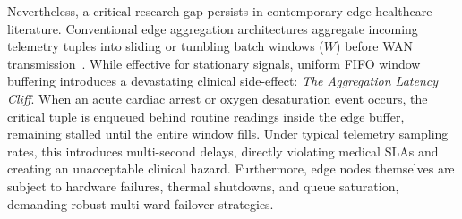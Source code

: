 \documentclass[conference]{IEEEtran}
\begin{document}
Nevertheless, a critical research gap persists in contemporary edge healthcare literature. Conventional edge aggregation architectures aggregate incoming telemetry tuples into sliding or tumbling batch windows ($W$) before WAN transmission~\cite{Pace2019}. While effective for stationary signals, uniform FIFO window buffering introduces a devastating clinical side-effect: \textit{The Aggregation Latency Cliff}. When an acute cardiac arrest or oxygen desaturation event occurs, the critical tuple is enqueued behind routine readings inside the edge buffer, remaining stalled until the entire window fills. Under typical telemetry sampling rates, this introduces multi-second delays, directly violating medical SLAs and creating an unacceptable clinical hazard. Furthermore, edge nodes themselves are subject to hardware failures, thermal shutdowns, and queue saturation, demanding robust multi-ward failover strategies.
\end{document}
